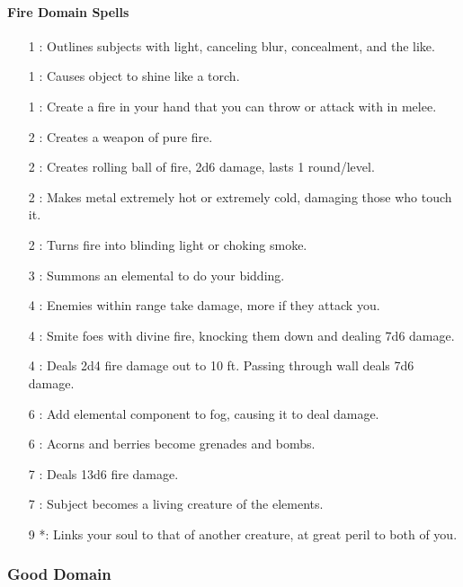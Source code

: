 \paragraph{Fire Domain Spells}
\begin{itemize}
\item[1] : Outlines subjects with light, canceling blur, concealment, and the like.
\item[1] : Causes object to shine like a torch.
\item[1] : Create a fire in your hand that you can throw or attack with in melee.
\item[2] : Creates a weapon of pure fire.
\item[2] : Creates rolling ball of fire, 2d6 damage, lasts 1 round/level.
\item[2] : Makes metal extremely hot or extremely cold, damaging those who touch it.
\item[2] : Turns fire into blinding light or choking smoke.
\item[3] : Summons an elemental to do your bidding.
\item[4] : Enemies within range take damage, more if they attack you.
\item[4] : Smite foes with divine fire, knocking them down and dealing 7d6 damage.
\item[4] : Deals 2d4 fire damage out to 10 ft. Passing through wall deals 7d6 damage.
\item[6] : Add elemental component to fog, causing it to deal damage.
\item[6] : Acorns and berries become grenades and bombs.
\item[7] : Deals 13d6 fire damage.
\item[7] : Subject becomes a living creature of the elements.
\item[9] *: Links your soul to that of another creature, at great peril to both of you.
\end{itemize}
\subsubsection{Good Domain}
